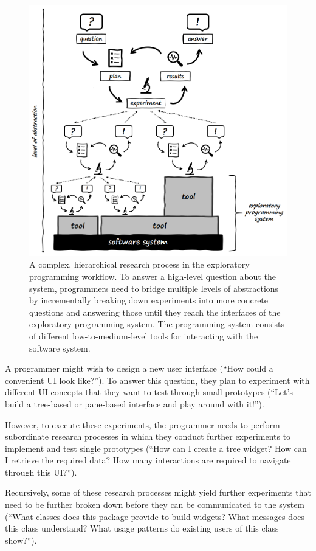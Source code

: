 \begin{figure}
	\centering
	\includegraphics[width=\textwidth]{01_exp/complex_process.png}
	\caption[A \emph{hierarchical research process} in the exploratory programming workflow.]{
		A complex, hierarchical research process in the exploratory programming workflow.
		To answer a high-level question about the system, programmers need to bridge multiple levels of abstractions by incrementally breaking down experiments into more concrete questions and answering those until they reach the interfaces of the exploratory programming system.
		The programming system consists of different low-to-medium-level tools for interacting with the software system.
	}
	\label{fig:background/exp/complex_process}
\end{figure}

\begin{example}
	A programmer might wish to design a new user interface (``How could a convenient UI look like?'').
	To answer this question, they plan to experiment with different UI concepts that they want to test through small prototypes (``Let's build a tree-based or pane-based interface and play around with it!'').

	However, to execute these experiments, the programmer needs to perform subordinate research processes in which they conduct further experiments to implement and test single prototypes (``How can I create a tree widget? How can I retrieve the required data? How many interactions are required to navigate through this UI?'').

	Recursively, some of these research processes might yield further experiments that need to be further broken down before they can be communicated to the system (``What classes does this package provide to build widgets? What messages does this class understand? What usage patterns do existing users of this class show?'').
\end{example}
